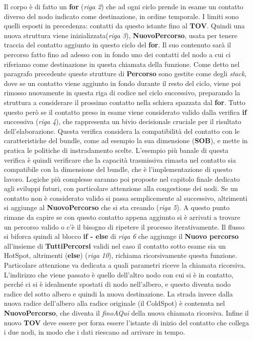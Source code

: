 \documentclass[12pt,a4paper,oneside]{book}
\begin{document}
		Il corpo è di fatto un {\bf for} ({\it riga 2}) che ad ogni ciclo prende in esame un contatto diverso del nodo indicato come destinazione, in ordine temporale. I limiti sono quelli esposti in precedenza: contatti da questo istante fino al {\bf TOV}. Quindi una nuova struttura viene inizializzata({\it riga 3}), {\bf NuovoPercorso}, usata per tenere traccia del contatto aggiunto in questo ciclo del {\bf for}. Il suo contenuto sarà il percorso fatto fino ad adesso con in fondo uno dei contatti del nodo a cui ci riferiamo come destinazione in questa chiamata della funzione. Come detto nel paragrafo precedente queste strutture di {\bf Percorso} sono gestite come degli {\it stack}, dove se un contatto viene aggiunto in fondo durante il resto del ciclo, viene poi rimosso nuovamente in questa riga di codice nel ciclo successivo, preparando la struttura a considerare il prossimo contatto nella schiera spazzata dal {\bf for}. Tutto questo però se il contatto preso in esame viene considerato valido dalla verifica {\bf if} successiva ({\it riga 4}), che rappresenta un bivio decisionale cruciale per il risultato dell'elaborazione. Questa verifica considera la compatibilità del contatto con le caratteristiche del bundle, come ad esempio la sua dimensione ({\bf SOB}), e mette in pratica le politiche di instradamento scelte. L'esempio più banale di questa verifica è quindi verificare che la capacità trasmissiva rimasta nel contatto sia compatibile con la dimensione del bundle, che è l'implementazione di questo lavoro. Logiche più complesse saranno poi proposte nel capitolo finale dedicato agli sviluppi futuri, con particolare attenzione alla congestione dei nodi. Se un contatto non è considerato valido si passa semplicemente al successivo, altrimenti si aggiunge al {\bf NuovoPercorso} che si sta creando ({\it riga 5}). A questo punto rimane da capire se con questo contatto appena aggiunto si è arrivati a trovare un percorso valido o c'è il bisogno di ripetere il processo iterativamente. Il flusso si biforca quindi al blocco {\bf if - else} di {\it riga 6} che aggiunge il {\bf Nuovo percorso} all'insieme di {\bf TuttiPercorsi} validi nel caso il contatto sotto esame sia un HotSpot, altrimenti ({\bf else}) ({\it riga 10}), richiama ricorsivamente questa funzione. Particolare attenzione va dedicata a quali parametri riceve la chiamata ricorsiva. L'indirizzo che viene passato è quello dell'altro nodo con cui si è in contatto, perché ci si è idealmente spostati di nodo nell'albero, e questo diventa nodo radice del sotto albero e quindi la nuova destinazione. La strada invece dalla nuova radice dell'albero alla radice originale (il ColdSpot) è contenuta nel {\bf NuovoPercorso}, che diventa il {\it finoAQui} della nuova chiamata ricorsiva. Infine il nuovo {\bf TOV} deve essere per forza essere l'istante di inizio del contatto che collega i due nodi, in modo che i dati riescano ad arrivare in tempo. 
\end{document}
